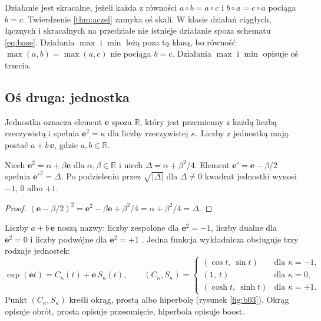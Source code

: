 \documentclass[11pt,a4paper]{article}
\newcommand{\ue}{\mathbf{e}}                 %
\begin{document}
Działanie jest skracalne, jeżeli każda z równości $a\circ b=a\circ c$
i $b\circ a=c\circ a$ pociąga $b=c$. Twierdzenie \ref{thm:aczel} zamyka oś
skali. W klasie działań ciągłych, łącznych i skracalnych na przedziale nie
istnieje działanie spoza schematu \eqref{eq:base}. Działania $\max$ i $\min$
leżą poza tą klasą, bo równość $\max(a,b)=\max(a,c)$ nie pociąga $b=c$.
Działania $\max$ i $\min$ opisuje oś trzecia.

\subsection{Oś druga: jednostka}

\begin{definition}[jednostka]
\label{def:unit}
Jednostka oznacza element $\ue$ spoza $\mathbb{R}$, który jest przemienny
z każdą liczbą rzeczywistą i spełnia $\ue^{2}=\kappa$ dla liczby rzeczywistej
$\kappa$. Liczby z jednostką mają postać $a+b\,\ue$, gdzie
$a, b\in\mathbb{R}$.
\end{definition}

\begin{proposition}
\label{prop:three}
Niech $\ue^{2}=\alpha+\beta\ue$ dla $\alpha, \beta\in\mathbb{R}$ i niech
$\Delta=\alpha+\beta^{2}/4$. Element $\ue'=\ue-\beta/2$ spełnia
$\ue'^{2}=\Delta$. Po podzieleniu przez $\sqrt{|\Delta|}$ dla $\Delta\neq0$
kwadrat jednostki wynosi $-1$, $0$ albo $+1$.
\end{proposition}

\begin{proof}
$(\ue-\beta/2)^{2}=\ue^{2}-\beta\ue+\beta^{2}/4=\alpha+\beta^{2}/4=\Delta$.
\end{proof}

Liczby $a+b\,\ue$ noszą nazwy: liczby zespolone dla $\ue^{2}=-1$, liczby dualne
dla $\ue^{2}=0$ i liczby podwójne dla $\ue^{2}=+1$ \cite{yaglom1979}. Jedna
funkcja wykładnicza obsługuje trzy rodzaje jednostek:
\begin{equation}
\label{eq:exp}
\exp(\ue t)=C_{\kappa}(t)+\ue\,S_{\kappa}(t),\qquad
(C_{\kappa},S_{\kappa})=
\begin{cases}
(\cos t,\ \sin t) & \text{dla } \kappa=-1,\\
(1,\ t) & \text{dla } \kappa=0,\\
(\cosh t,\ \sinh t) & \text{dla } \kappa=+1.
\end{cases}
\end{equation}
Punkt $(C_{\kappa},S_{\kappa})$ kreśli okrąg, prostą albo hiperbolę
(rysunek \ref{fig:b03}). Okrąg opisuje obrót, prosta opisuje przesunięcie,
hiperbola opisuje boost.
\end{document}
